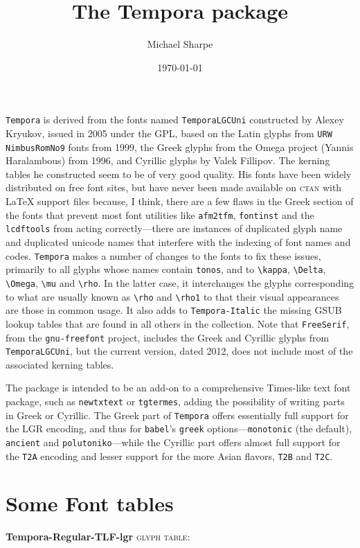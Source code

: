 \documentclass[11pt]{article}
\title{The Tempora package}
\author{Michael Sharpe}
\date{\today}
\begin{document}
\maketitle
{\tt Tempora} is derived from the fonts named {\tt TemporaLGCUni} constructed by Alexey Kryukov, issued in 2005 under the GPL, based on the Latin glyphs from {\tt URW NimbusRomNo9} fonts from 1999, the Greek glyphs from the Omega project (Yannis Haralambous) from 1996, and Cyrillic glyphs by Valek Fillipov. The kerning tables he constructed seem to be of very good quality. His fonts have been widely distributed on free font sites, but have never been made available on \textsc{ctan} with LaTeX support files because, I think, there are a few flaws in the Greek section of the fonts that prevent most font utilities like {\tt afm2tfm}, {\tt fontinst} and the {\tt lcdftools} from acting correctly---there are instances of duplicated glyph name and duplicated unicode names that  interfere with the indexing of font names and codes. {\tt Tempora} makes a number of changes to the fonts to fix these issues, primarily to all glyphs whose names contain {\tt tonos}, and to \verb|\kappa|, \verb|\Delta|, \verb|\Omega|, \verb|\mu| and \verb|\rho|. In the latter case, it interchanges the glyphs corresponding to what are usually known as \verb|\rho| and \verb|\rho1| to that their visual appearances are those in common usage. It also adds to {\tt Tempora-Italic} the missing GSUB lookup tables that are found in all others in the collection. Note that {\tt FreeSerif}, from the {\tt gnu-freefont} project, includes the Greek and Cyrillic glyphs from {\tt TemporaLGCUni}, but the current version, dated 2012,  does not include most of the associated kerning tables.

The package is intended to be an add-on to a comprehensive Times-like text font package, such as {\tt newtxtext} or {\tt tgtermes}, adding the possibility of writing parts in Greek or Cyrillic. The Greek part of {\tt Tempora} offers essentially full support for the LGR encoding, and thus for {\tt babel}'s {\tt greek} options---{\tt monotonic} (the default), {\tt ancient} and {\tt polutoniko}---while the Cyrillic part offers almost full support for the {\tt T2A} encoding and lesser support for the more Asian flavors, {\tt T2B} and {\tt T2C}. 
\newpage
\section*{Some Font tables}
\def\tfmname{Tempora-Regular-TLF-lgr}
\textbf{\tfmname} \textsc{glyph table}:\hspace{.3in} 
\fonttable{\tfmname}
\end{document}
